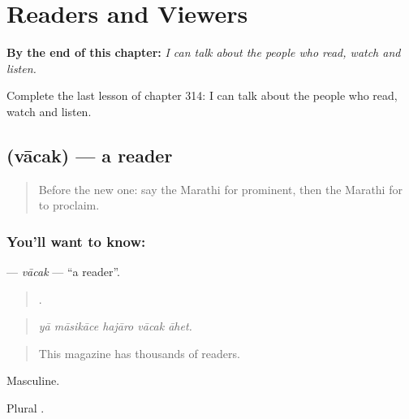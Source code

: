 
\chapter{Readers and Viewers}
\label{ch:mr-readers-and-viewers}

\begin{chapteropening}
\textbf{By the end of this chapter:} \emph{I can talk about the people who read, watch and listen.}

Complete the last lesson of chapter 314: I can talk about the people who read, watch and listen.
\end{chapteropening}

\section[\texorpdfstring{\mr{वाचक} (vācak)}{वाचक (vācak)}]{ (vācak) — a reader}

\label{lesson:MR-C314-vacak}



\begin{quote}
Before the new one: say the Marathi for prominent, then the Marathi for to proclaim.
\end{quote}

\subsection*{You'll want to know: }
\textbf{} — \emph{vācak} — \textquotedblleft{}a reader\textquotedblright{}.

\begin{quote}
    .
\end{quote}

\begin{quote}
\emph{yā māsikāce hajāro vācak āhet.}
\end{quote}

\begin{quote}
This magazine has thousands of readers.
\end{quote}

Masculine.

Plural .

